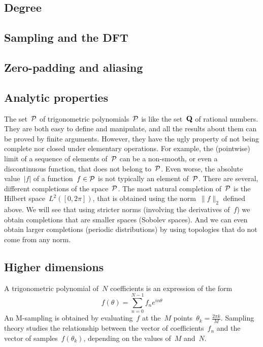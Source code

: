 \subsection{Degree}


\subsection{Sampling and the DFT}


\subsection{Zero-padding and aliasing}


\subsection{Analytic properties}

The set~$\mathcal{P}$ of trigonometric polynomials~$\mathcal{P}$ is like the set~$\mathbf{Q}$ of rational
numbers. They are both easy to define and manipulate, and all the results about
them can be proved by finite arguments.  However, they have the ugly property
of not being complete nor closed under elementary operations.  For example, the
(pointwise) limit of a sequence of elements of~$\mathcal{P}$ can be a non-smooth, or
even a discontinuous function, that does not belong to~$\mathcal{P}$.  Even worse, the
absolute value~$|f|$ of a function~$f\in\mathcal{P}$ is not typically an element
of~$\mathcal{P}$.  There are several, different completions of the space~$\mathcal{P}$.  The most
natural completion of~$\mathcal{P}$ is the Hilbert space~$L^2([0,2\pi])$, that is
obtained using the norm~$\|f\|_2$ defined above.  We will see that using
stricter norms (involving the derivatives of~$f$) we obtain completions that
are smaller spaces (Sobolev spaces).  And we can even obtain larger completions
(periodic distributions) by using topologies that do not come from any norm.


\subsection{Higher dimensions}

\clearpage
\thispagestyle{empty}

A trigonometric polynomial of~$N$ coefficients is an expression of the form
\[
	f(\theta)=\sum_{n=0}^{N-1} f_n e^{in\theta}
\]
An M-sampling is obtained by evaluating~$f$ at the~$M$
points~$\theta_k=\frac{2\pi k}{M}$.
Sampling theory studies the relationship between the vector of
coefficients~$f_n$ and the vector of samples~$f(\theta_k)$, depending on the
values of~$M$ and~$N$.


